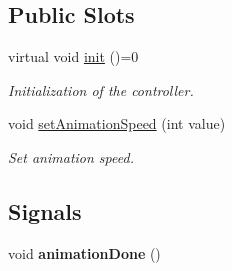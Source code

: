 \subsection*{Public Slots}
\begin{DoxyCompactItemize}
\item 
virtual void \hyperlink{classWorldAbstractController_af2ab5103153a68f66dcdf75d6c9a4d93}{init} ()=0
\begin{DoxyCompactList}\small\item\em Initialization of the controller. \end{DoxyCompactList}\item 
void \hyperlink{classWorldAbstractController_ab271df7d1af98b87afc0d50a4156616a}{set\+Animation\+Speed} (int value)
\begin{DoxyCompactList}\small\item\em Set animation speed. \end{DoxyCompactList}\end{DoxyCompactItemize}
\subsection*{Signals}
\begin{DoxyCompactItemize}
\item 
void {\bfseries animation\+Done} ()\hypertarget{classWorldAbstractController_ae967946c752a88d3e18a365389f349eb}{}\label{classWorldAbstractController_ae967946c752a88d3e18a365389f349eb}

\end{DoxyCompactItemize}
